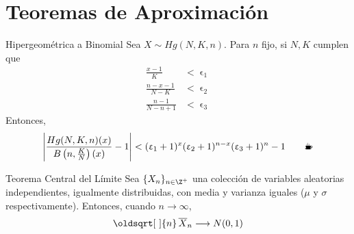 \documentclass{beamer}
\renewcommand*{\sqrt}[2][\ ]{\oldsqrt[#1]{#2}}
\renewcommand{\epsilon}{\upvarepsilon}
\begin{document}
\section{Teoremas de Aproximación}
\begin{frame}{Hipergeométrica a Binomial}
  Sea $X\sim Hg(N,K,n)$. Para $n$ fijo, si $N,K$ cumplen que
  \begin{align*}
    \frac{x-1}{K}         &< \epsilon_1\\
    \frac{n-x-1}{N-K}     &< \epsilon_2\\
    \frac{n-1}{N - n + 1} &< \epsilon_3
  \end{align*}
  Entonces,
  \[
    \left|\dfrac{Hg(N,K,n)(x)}{B\left(n,\frac{K}{N}\right)(x)} - 1\right| 
    < (\epsilon_1 + 1)^{x}(\epsilon_2 + 1)^{n-x}(\epsilon_3 + 1)^{n} - 1
    \qquad\text{\Coffeecup}
  \]
\end{frame}
\begin{frame}{Teorema Central del Límite}
  Sea $\{X_n\}_{n\in\Z^+}$ una colección de variables aleatorias independientes,
  igualmente distribuidas, con media y varianza iguales ($\mu$ y $\sigma$
  respectivamente). Entonces, cuando $n\longrightarrow\infty$,
  \[\sqrt{n}\,\overline{X}_n\longrightarrow N(0,1)\]
\end{frame}
\end{document}
